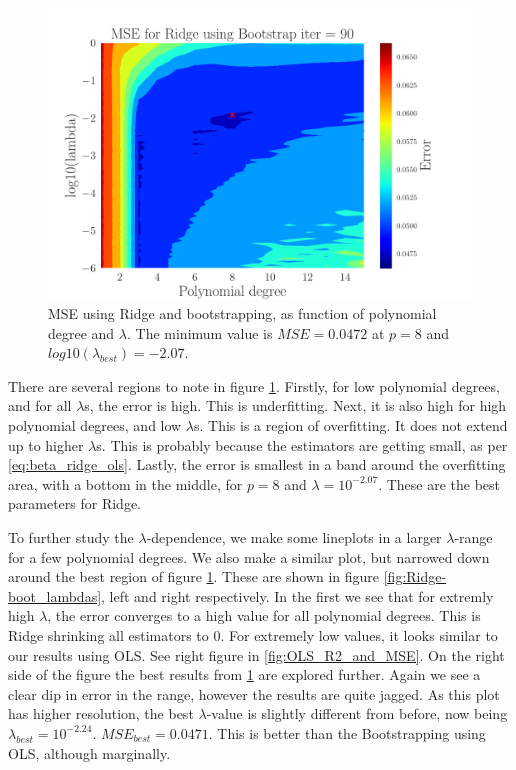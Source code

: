 \documentclass[reprint,english,notitlepage,aps,nobalancelastpage,nofootinbib]{revtex4-1}  %
\begin{document}
\begin{figure}[H]
	\begin{center}
		\includegraphics[width=0.8\linewidth]{Contour_PL_Ridge_Bootstrap90_n30_eps0.2_p1_15_lmb0_m6.pdf}
	\end{center}
	\caption{MSE using Ridge and bootstrapping, as function of polynomial degree and $\lambda$. The minimum value is $MSE=0.0472$ at $p=8$ and $log10(\lambda_{best}) = -2.07$.}
	\label{fig:Ridge-boot_heatmap}
\end{figure}

There are several regions to note in figure \ref{fig:Ridge-boot_heatmap}. Firstly, for low polynomial degrees, and for all $\lambda$s, the error is high. This is underfitting. Next, it is also high for high polynomial degrees, and low $\lambda$s. This is a region of overfitting. It does not extend up to higher $\lambda$s. This is probably because the estimators are getting small, as per \eqref{eq:beta_ridge_ols}. Lastly, the error is smallest in a band around the overfitting area, with a bottom in the middle, for $p=8$ and $\lambda=10^{-2.07}$. These are the best parameters for Ridge.

To further study the $\lambda$-dependence, we make some lineplots in a larger $\lambda$-range for a few polynomial degrees. We also make a similar plot, but narrowed down around the best region of figure \ref{fig:Ridge-boot_heatmap}. These are shown in figure \ref{fig:Ridge-boot_lambdas}, left and right respectively. In the first we see that for extremly high $\lambda$, the error converges to a high value for all polynomial degrees. This is Ridge shrinking all estimators to $0$.  For extremely low values, it looks similar to our results using OLS. See right figure in \ref{fig:OLS_R2_and_MSE}. On the right side of the figure the best results from \ref{fig:Ridge-boot_heatmap} are explored further. Again we see a clear dip in error in the range, however the results are quite jagged. As this plot has higher resolution, the best $\lambda$-value is slightly different from before,  now being $\lambda_{best} = 10^{-2.24}$. $MSE_{best}=0.0471$.  This is better than the Bootstrapping using OLS, although marginally.
\end{document}
